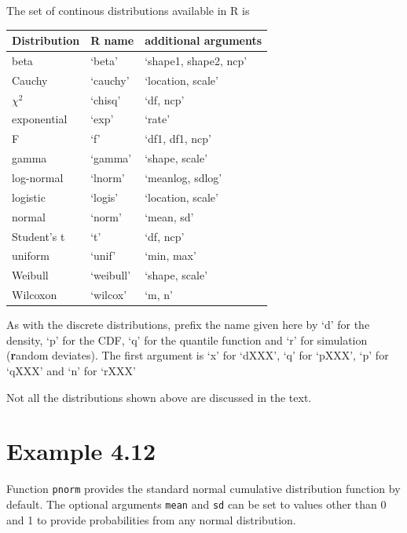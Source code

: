 \documentclass{book}
\begin{document}
The set of continous distributions available in R is
\begin{center}
  \begin{tabular}{l l l}
    \multicolumn{1}{c}{Distribution}&
    \multicolumn{1}{c}{R name}&
    \multicolumn{1}{c}{additional arguments}\\\hline
    beta          & `beta'   &  `shape1, shape2, ncp' \\
    Cauchy        & `cauchy' & `location, scale'  \\
    $\chi^2$       & `chisq'  & `df, ncp' \\
    exponential   & `exp'    & `rate' \\
    F             & `f'      & `df1, df1, ncp' \\
    gamma         & `gamma'  & `shape, scale' \\
    log-normal    & `lnorm'  & `meanlog, sdlog' \\
    logistic      & `logis'  & `location, scale' \\
    normal        & `norm'   & `mean, sd' \\
    Student's t   & `t'      & `df, ncp' \\
    uniform       & `unif'   & `min, max' \\
    Weibull       & `weibull'& `shape, scale'\\
    Wilcoxon      & `wilcox' & `m, n'\\
    \hline
  \end{tabular}
\end{center}

As with the discrete distributions, prefix the name given here by `d'
for the density, `p' for the CDF, `q' for the quantile function and
`r' for simulation (\textbf{r}andom deviates).  The first argument is
`x' for `dXXX', `q' for `pXXX', `p' for `qXXX' and `n' for `rXXX'

Not all the distributions shown above are discussed in the text.


\section{Example 4.12}
\label{sec:xmp0412}

Function \texttt{pnorm} provides the standard normal cumulative
distribution function by default.  The optional arguments
\texttt{mean} and \texttt{sd} can be set to values other than 0 and 1
to provide probabilities from any normal distribution.
\end{document}
